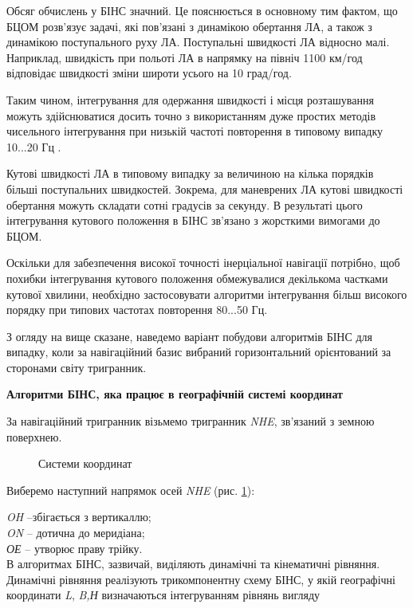 Обсяг обчислень у БІНС значний. Це пояснюється в основному тим фактом, що БЦОМ розв'язує 
задачі, які пов'язані з динамікою обертання ЛА, а також з динамікою поступального 
руху ЛА. Поступальні швидкості ЛА відносно малі. Наприклад, швидкість при польоті 
ЛА в напрямку на північ 1100 км/год відповідає швидкості зміни широти усього на 10 
град/год.

Таким чином, інтегрування для одержання швидкості і місця розташування можуть здійснюватися 
досить точно з використанням дуже простих методів чисельного інтегрування при низькій 
частоті повторення   в типовому випадку 10...20 Гц .

Кутові швидкості ЛА в типовому випадку за величиною на кілька порядків більші поступальних 
швидкостей. Зокрема, для маневрених ЛА кутові швидкості обертання можуть складати 
сотні градусів за секунду. В результаті цього інтегрування кутового положення в БІНС 
зв'язано з жорсткими вимогами до БЦОМ.

Оскільки для забезпечення високої точності інерціальної навігації потрібно, щоб похибки 
інтегрування кутового положення обмежувалися декількома частками кутової хвилини, 
необхідно застосовувати алгоритми інтегрування більш високого порядку при типових 
частотах повторення  80...50 Гц. 

З огляду на вище сказане, наведемо  варіант побудови алгоритмів БІНС для випадку, 
коли за навігаційний базис вибраний горизонтальний орієнтований за сторонами світу 
тригранник.

\vspace{5mm}
\textbf{Алгоритми БІНС, яка працює в географічній системі координат}

За навігаційний тригранник візьмемо тригранник \textit{NHE}, зв'язаний з земною поверхнею.
\begin{figure}[here]
\centering
\caption{Системи координат}
\label{fig:earth}
\end{figure} 
Виберемо наступний напрямок осей   \textit{NHE} (рис. \ref{fig:earth}):

\textit{OH } --збігається з вертикаллю;\\
\textit{ON} -- дотична до меридіана;\\
\textit{ОЕ} -- утворює праву трійку.\\ 

В алгоритмах БІНС, зазвичай, виділяють динамічні та кінематичні рівняння. 
Динамічні рівняння реалізують трикомпонентну схему БІНС, у якій географічні координати  \textit{L}, 
\textit{B,Н} визначаються інтегруванням рівнянь вигляду


